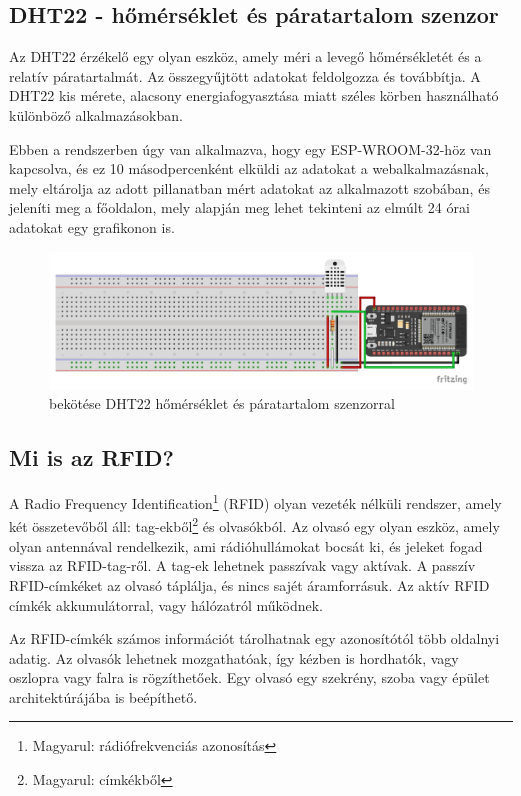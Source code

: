 \documentclass[
]{thesis-ekf}
\theoremstyle{definition}
\theoremstyle{remark}
\begin{document}
	\subsection{DHT22 - hőmérséklet és páratartalom szenzor}
	
	Az DHT22 érzékelő egy olyan eszköz, amely méri a levegő hőmérsékletét és a relatív  páratartalmát. Az összegyűjtött adatokat feldolgozza és továbbítja. A DHT22 kis mérete, alacsony energiafogyasztása miatt széles körben használható különböző alkalmazásokban.\cite{dht22}
	
	Ebben a rendszerben úgy van alkalmazva, hogy egy ESP-WROOM-32-höz van kapcsolva, és ez 10 másodpercenként elküldi az adatokat a webalkalmazásnak, mely eltárolja az adott pillanatban mért adatokat az alkalmazott szobában, és jeleníti meg a főoldalon, mely alapján meg lehet tekinteni az elmúlt 24 órai adatokat egy grafikonon is.
		\begin{figure}[ht!]
		\centering
		\includegraphics[width=1\textwidth]{./src/schematics/temperature and humidity sensor_bb}
		\caption{ bekötése DHT22 hőmérséklet és páratartalom szenzorral}
		\label{dht22-schematics}
	\end{figure}	
	
	\subsection{Mi is az RFID?}\label{what-is-rfid}
	A Radio Frequency Identification\footnote{Magyarul: rádiófrekvenciás azonosítás} (RFID) olyan vezeték nélküli rendszer, amely két összetevőből áll: tag-ekből\footnote{Magyarul: címkékből} és olvasókból. Az olvasó egy olyan eszköz, amely olyan antennával rendelkezik, ami rádióhullámokat bocsát ki, és jeleket fogad vissza az RFID-tag-ről. A tag-ek lehetnek passzívak vagy aktívak. A passzív RFID-címkéket az olvasó táplálja, és nincs sajét áramforrásuk. Az aktív RFID címkék akkumulátorral, vagy hálózatról működnek.
	
	Az RFID-címkék számos információt tárolhatnak egy azonosítótól több oldalnyi adatig. Az olvasók lehetnek mozgathatóak, így kézben is hordhatók, vagy oszlopra vagy falra is rögzíthetőek. Egy olvasó egy szekrény, szoba vagy épület architektúrájába is beépíthető.\cite{rfid-desc}
	
\end{document}
